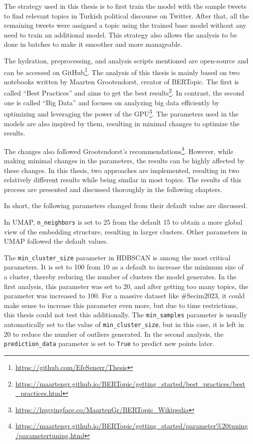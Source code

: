 The strategy used in this thesis is to first train the model with the sample tweets to 
find relevant topics in Turkish political discourse on Twitter. After that, all the 
remaining tweets were assigned a topic using the trained base model without any need to train 
an additional model. This strategy also allows the analysis to be done in batches to make 
it smoother and more manageable.

The hydration, preprocessing, and analysis scripts mentioned are open-source and can be 
accessed on GitHub\footnote{\url{https://github.com/EfeSenerr/Thesis}}. The analysis of 
this thesis is mainly based on two notebooks written by Maarten Grootendorst, creator of 
BERTopic. The first is called ``Best Practices''
and aims to get the best results\footnote{\url{https://maartengr.github.io/BERTopic/getting_started/best_practices/best_practices.html}}. 
In contrast, the second one is called ``Big Data'' 
and focuses on analyzing big data efficiently by optimizing and leveraging the power of the 
GPU\footnote{\url{https://huggingface.co/MaartenGr/BERTopic_Wikipedia}}. 
The parameters used in the models are also inspired by them, resulting in minimal changes 
to optimize the results. 

The changes also followed Grootendorst's 
recommendations\footnote{\url{https://maartengr.github.io/BERTopic/getting_started/parameter\%20tuning/parametertuning.html}}.
However, while making minimal changes in the parameters, the results can be highly affected 
by these changes. In this thesis, two approaches are implemented, resulting in two relatively 
different results while being similar in most topics. The results of this process are 
presented and discussed thoroughly in the following chapters.

In short, the following parameters changed from their default value are discussed. 

In \ac{UMAP}, \texttt{n\_neighbors} is set to 25 from the default 15 to obtain a more global view of 
the embedding structure, resulting in larger clusters. Other parameters in \ac{UMAP} followed 
the default values.

The \texttt{min\_cluster\_size} parameter in \ac{HDBSCAN} is among the most critical parameters. It is 
set to 100 from 10 as a default to increase the minimum size of a cluster, thereby reducing 
the number of clusters the model generates. In the first analysis, this parameter was set to 
20, and after getting too many topics, the parameter was increased to 100. For a massive 
dataset like \#Secim2023, it could make sense to increase this parameter even more, but due 
to time restrictions, this thesis could not test this additionally. The \texttt{min\_samples} 
parameter is usually automatically set to the value of \texttt{min\_cluster\_size}, but in this 
case, it is left in 20 to reduce the number of outliers generated. In the second analysis, 
the \texttt{prediction\_data} parameter is set to \texttt{True} to predict new points later.

